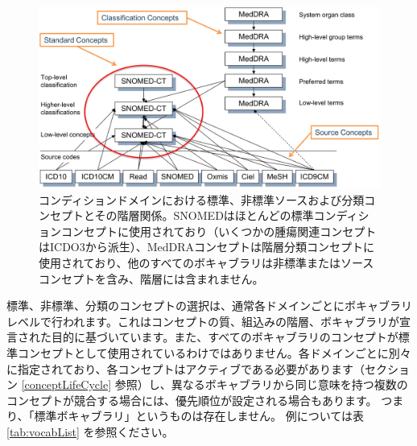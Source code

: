 \documentclass[
  11pt]{book}
\theoremstyle{definition}
\theoremstyle{definition}
\theoremstyle{definition}
\theoremstyle{definition}
\theoremstyle{remark}
\begin{document}
\begin{figure}

{\centering \includegraphics[width=1\linewidth]{images/StandardizedVocabularies/hierarchy} 

}

\caption{コンディションドメインにおける標準、非標準ソースおよび分類コンセプトとその階層関係。SNOMEDはほとんどの標準コンディションコンセプトに使用されており（いくつかの腫瘍関連コンセプトはICDO3から派生）、MedDRAコンセプトは階層分類コンセプトに使用されており、他のすべてのボキャブラリは非標準またはソースコンセプトを含み、階層には含まれません。}\label{fig:hierarchy}
\end{figure}

標準、非標準、分類のコンセプトの選択は、通常各ドメインごとにボキャブラリレベルで行われます。これはコンセプトの質、組込みの階層、ボキャブラリが宣言された目的に基づいています。また、すべてのボキャブラリのコンセプトが標準コンセプトとして使用されているわけではありません。各ドメインごとに別々に指定されており、各コンセプトはアクティブである必要があります（セクション \ref{conceptLifeCycle} 参照）し、異なるボキャブラリから同じ意味を持つ複数のコンセプトが競合する場合には、優先順位が設定される場合もあります。 つまり、「標準ボキャブラリ」というものは存在しません。 例については表 \ref{tab:vocabList} を参照ください。
\end{document}

